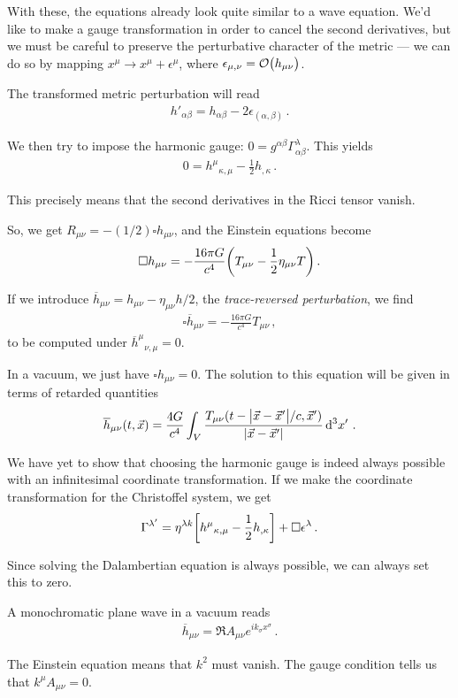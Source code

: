 \documentclass[main.tex]{subfiles}
\begin{document}
With these, the equations already look quite similar to a wave equation. 
We'd like to make a gauge transformation in order to cancel the second derivatives, but we must be careful to preserve the perturbative character of the metric --- we can do so by mapping \(x^{\mu } \to x^{\mu } + \epsilon^\mu \), where \(\epsilon_{\mu , \nu } = \order{h_{\mu \nu }}\). 

The transformed metric perturbation will read 
%
\begin{align}
h'_{\alpha \beta } = h_{\alpha \beta } - 2 \epsilon_{(\alpha , \beta )}
\,.
\end{align}

We then try to impose the harmonic gauge: \(0 = g^{\alpha \beta } \Gamma^{\lambda }_{\alpha \beta }\). This yields 
%
\begin{align}
0 = h^{\mu }{}_{\kappa, \mu } - \frac{1}{2} h_{, \kappa } 
\,.
\end{align}

This precisely means that the second derivatives in the Ricci tensor vanish. 

So, we get \(R_{\mu \nu } = -(1/2) \square h_{\mu \nu }\), and the Einstein equations become 
%
\begin{align}
\square h_{\mu \nu } = - \frac{16 \pi G}{c^{4}} \qty(T_{\mu \nu } - \frac{1}{2} \eta_{\mu \nu } T)
\,.
\end{align}

If we introduce \(\overline{h}_{\mu \nu } = h_{\mu \nu } - \eta_{\mu \nu } h / 2\), the \emph{trace-reversed perturbation}, we find 
%
\begin{align}
\square \overline{h}_{\mu \nu } = - \frac{16 \pi G}{c^{4}} T_{\mu \nu}
\,,
\end{align}
%
to be computed under \(\overline{h}^{\mu }{}_{\nu , \mu } = 0\). 

In a vacuum, we just have \(\square h_{\mu \nu } = 0\). 
The solution to this equation will be given in terms of 
retarded quantities 
%
\begin{align}
\overline{h}_{\mu \nu } (t, \vec{x}) = \frac{4 G}{c^{4}}
\int_{V} \frac{T_{\mu \nu } (t - \abs{\vec{x} - \vec{x}'} / c, \vec{x}')}{\abs{\vec{x} - \vec{x}'}} \dd[3]{x'}
\,.
\end{align}

We have yet to show that choosing the harmonic gauge is indeed always possible with an infinitesimal coordinate transformation. 
If we make the coordinate transformation for the Christoffel system, we get 
%
\begin{align}
\Gamma^{\lambda '} = \eta^{\lambda k } \qty[h^{\mu }{}_{\kappa, \mu } - \frac{1}{2} h_{, \kappa }] + \square \epsilon^{\lambda }
\,.
\end{align}

Since solving the Dalambertian equation is always possible, 
we can always set this to zero. 

A monochromatic plane wave in a vacuum reads 
%
\begin{align}
\overline{h}_{\mu \nu } = \Re A_{\mu \nu } e^{i k_{\sigma } x^{\sigma }}
\,.
\end{align}

The Einstein equation means that \(k^2\) must vanish. 
The gauge condition tells us that \(k^{\mu }A_{\mu \nu } = 0\). 
\end{document}
